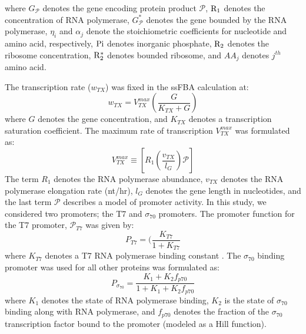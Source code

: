 \documentclass[journal=asbcd6,manuscript=article]{achemso}
\begin{document}
where $G_{\mathcal{P}}$ denotes the gene encoding protein product $\mathcal{P}$,
$\rm R_{1}$ denotes the concentration of RNA polymerase,
$G_{\mathcal{P}}^{*}$ denotes the gene bounded by the RNA polymerase,
$\eta_{i}$ and $ \alpha_{j}$ denote the stoichiometric coefficients for nucleotide and amino acid, respectively,
$\rm Pi$ denotes inorganic phosphate,
$\rm R_{2}$ denotes the ribosome concentration,
$\rm R_{2}^{*}$ denotes bounded ribosome,
and $AA_{j}$ denotes $j^{th}$ amino acid.

The transcription rate ($w_{TX}$) was fixed in the ssFBA calculation at:
\begin{equation}
	w_{TX} = V_{TX}^{max}\left(\frac{G}{K_{TX}+G}\right)
\end{equation}
where $G$ denotes the gene concentration, and $K_{TX}$ denotes a transcription saturation coefficient.
The maximum rate of transcription $V_{TX}^{max}$ was formulated as:
\begin{equation}
	V_{TX}^{max} \equiv \left[R_{1}\left(\frac{v_{TX}}{l_{G}}\right)\mathcal{P}\right]
\end{equation}
The term $R_{1}$ denotes the RNA polymerase abundance,
$v_{TX}$ denotes the RNA polymerase elongation rate (nt/hr),
$l_{G}$ denotes the gene length in nucleotides, and the last term $\mathcal{P}$ describes a model of promoter activity.
In this study, we considered two promoters; the T7 and $\sigma_{70}$ promoters.
The promoter function for the T7 promoter, $\mathcal{P}_{T7}$ was given by:
\begin{equation}
	P_{T7} = (\frac{K_{T7}}{1 + K_{T7}}
\end{equation}
where $K_{T7}$ denotes a T7 RNA polymerase binding constant \cite{Moon:2012aa}.
The $\sigma_{70}$ binding promoter was used for all other proteins was formulated as:
\begin{equation}
	P_{\sigma_{70}} = \frac{K_{1}+K_{2}f_{p70}}{1 + K_{1}+K_{2}f_{p70}}
\end{equation}
where $K_{1}$ denotes the state of RNA polymerase binding,
$K_{2}$ is the state of $\sigma_{70} $binding along with RNA polymerase,
and $f_{p70}$ denotes the fraction of the $\sigma_{70}$ transcription factor bound to the promoter (modeled as a Hill function).
\end{document}

